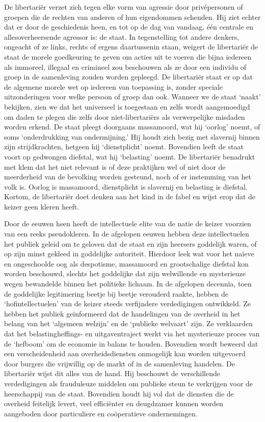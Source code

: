 \documentclass[
  a5paper,
  smalldemyvopaper,10pt,twoside,onecolumn,openright,extrafontsizes,hidelinks]{memoir}
\begin{document}
De libertariër verzet zich tegen elke vorm van agressie door
privépersonen of groepen die de rechten van anderen of hun eigendommen
schenden. Hij ziet echter dat er door de geschiedenis heen, en tot op de
dag van vandaag, één centrale en allesoverheersende agressor is: de
staat. In tegenstelling tot andere denkers, ongeacht of ze links, rechts
of ergens daartussenin staan, weigert de libertariër de staat de morele
goedkeuring te geven om acties uit te voeren die bijna iedereen als
immoreel, illegaal en crimineel zou beschouwen als ze door een individu
of groep in de samenleving zouden worden gepleegd. De libertariër staat
er op dat de algemene morele wet op iedereen van toepassing is, zonder
speciale uitzonderingen voor welke persoon of groep dan ook. Wanneer we
de staat `naakt' bekijken, zien we dat het universeel is toegestaan en
zelfs wordt aangemoedigd om daden te plegen die zelfs door
niet-libertariërs als verwerpelijke misdaden worden erkend. De staat
pleegt doorgaans massamoord, wat hij `oorlog' noemt, of soms
`onderdrukking van ondermijning.' Hij houdt zich bezig met slavernij
binnen zijn strijdkrachten, hetgeen hij `dienstplicht' noemt. Bovendien
leeft de staat voort op gedwongen diefstal, wat hij `belasting' noemt.
De libertariër benadrukt met klem dat het niet relevant is of deze
praktijken wel of niet door de meerderheid van de bevolking worden
gesteund, noch of er instemming van het volk is. Oorlog is massamoord,
dienstplicht is slavernij en belasting is diefstal. Kortom, de
libertariër doet denken aan het kind in de fabel en wijst erop dat de
keizer geen kleren heeft.

Door de eeuwen heen heeft de intellectuele elite van de natie de keizer
voorzien van een reeks pseudokleren. In de afgelopen eeuwen hebben deze
intellectuelen het publiek geleid om te geloven dat de staat en zijn
heersers goddelijk waren, of op zijn minst gekleed in goddelijke
autoriteit. Hierdoor leek wat voor het naïeve en ongeschoolde oog als
despotisme, massamoord en grootschalige diefstal kon worden beschouwd,
slechts het goddelijke dat zijn welwillende en mysterieuze wegen
bewandelde binnen het politieke lichaam. In de afgelopen decennia, toen
de goddelijke legitimering beetje bij beetje verouderd raakte, hebben de
`hofintellectuelen' van de keizer steeds verfijndere verdedigingen
ontwikkeld. Ze hebben het publiek geïnformeerd dat de handelingen van de
overheid in het belang van het `algemeen welzijn' en de `publieke
welvaart' zijn. Ze verklaarden dat het belastingheffings- en
uitgaventraject werkt via het mysterieuze proces van de `hefboom' om de
economie in balans te houden. Bovendien wordt beweerd dat een
verscheidenheid aan overheidsdiensten onmogelijk kan worden uitgevoerd
door burgers die vrijwillig op de markt of in de samenleving handelen.
De libertariër wijst dit alles van de hand. Hij beschouwt de
verschillende verdedigingen als frauduleuze middelen om publieke steun
te verkrijgen voor de heerschappij van de staat. Bovendien houdt hij vol
dat de diensten die de overheid feitelijk levert, veel efficiënter en
deugdzamer kunnen worden aangeboden door particuliere en coöperatieve
ondernemingen.
\end{document}
